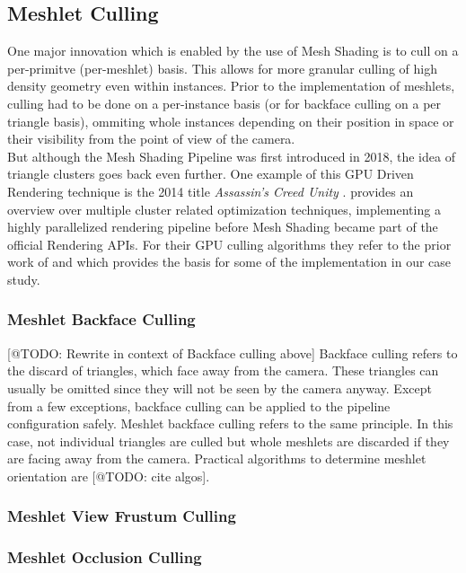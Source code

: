 \subsection{Meshlet Culling} \label{subsec-meshlet-culling}

One major innovation which is enabled by the use of Mesh Shading is to cull on a per-primitve (per-meshlet) basis. 
This allows for more granular culling of high density geometry even within instances. Prior to the implementation 
of meshlets, culling had to be done on a per-instance basis (or for backface culling on a per triangle basis), 
ommiting whole instances depending on their position in space or their visibility from the point of view of the camera.\\

\noindent
But although the Mesh Shading Pipeline was first introduced in 2018, the idea of triangle clusters goes back even further.
One example of this GPU Driven Rendering technique is the 2014 title \emph{Assassin's Creed Unity} \cite{Ubisoft2014}.
\cite{Aaltonen2015} provides an overview over multiple cluster related optimization techniques, implementing a highly 
parallelized rendering pipeline before Mesh Shading became part of the official Rendering \ac{API}s.
For their GPU culling algorithms they refer to the prior work of \cite{Hill11} and \cite{Greene93} which provides the 
basis for some of the implementation in our case study.


\subsubsection{Meshlet Backface Culling} \label{subsubsec-meshlet-backface-culling}

[@TODO: Rewrite in context of Backface culling above]
Backface culling refers to the discard of triangles, which face away from the camera. These triangles can usually be omitted 
since they will not be seen by the camera anyway. Except from a few exceptions, backface culling can be applied to the 
pipeline configuration safely. Meshlet backface culling refers to the same principle. In this case, not individual triangles  
are culled but whole meshlets are discarded if they are facing away from the camera. Practical algorithms to determine meshlet 
orientation are [@TODO: cite algos].\\ %


\subsubsection{Meshlet View Frustum Culling} \label{subsubsec-meshlet-view-frustum-culling}

\subsubsection{Meshlet Occlusion Culling} \label{subsubsec-meshlet-occlusion-culling}